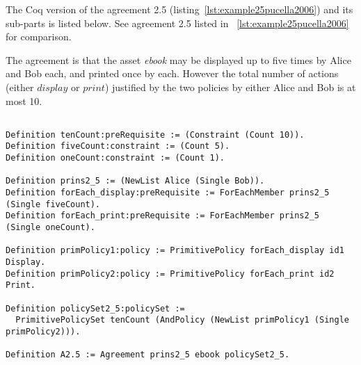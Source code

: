 The Coq version of the agreement 2.5 (listing~\ref{lst:example25pucella2006}) and its sub-parts is listed below. See agreement 2.5 listed in ~\ref{lst:example25pucella2006} for comparison.

The agreement is that the asset \emph{ebook} may be displayed up to five times by Alice and Bob each, and printed once by each. However the total number of actions (either $display$ or $print$) justified by the two policies by either Alice and Bob is at most 10.


\lstset{language=Coq}
\begin{lstlisting}[frame=single, caption={Example 2.5},label={lst:example25}]

Definition tenCount:preRequisite := (Constraint (Count 10)).
Definition fiveCount:constraint := (Count 5).
Definition oneCount:constraint := (Count 1).

Definition prins2_5 := (NewList Alice (Single Bob)).
Definition forEach_display:preRequisite := ForEachMember prins2_5 (Single fiveCount).
Definition forEach_print:preRequisite := ForEachMember prins2_5 (Single oneCount).

Definition primPolicy1:policy := PrimitivePolicy forEach_display id1 Display.
Definition primPolicy2:policy := PrimitivePolicy forEach_print id2 Print.

Definition policySet2_5:policySet :=
  PrimitivePolicySet tenCount (AndPolicy (NewList primPolicy1 (Single primPolicy2))).
                     
Definition A2.5 := Agreement prins2_5 ebook policySet2_5.

\end{lstlisting}








